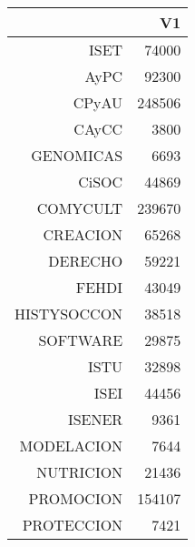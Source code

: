 \documentclass[12pt]{article}
\begin{document}
\begin{table}[ht]
\centering
\begin{tabular}{rr}
  \hline
 & V1 \\ 
  \hline
ISET & 74000 \\ 
  AyPC & 92300 \\ 
  CPyAU & 248506 \\ 
  CAyCC & 3800 \\ 
  GENOMICAS & 6693 \\ 
  CiSOC & 44869 \\ 
  COMYCULT & 239670 \\ 
  CREACION & 65268 \\ 
  DERECHO & 59221 \\ 
  FEHDI & 43049 \\ 
  HISTYSOCCON & 38518 \\ 
  SOFTWARE & 29875 \\ 
  ISTU & 32898 \\ 
  ISEI & 44456 \\ 
  ISENER & 9361 \\ 
  MODELACION & 7644 \\ 
  NUTRICION & 21436 \\ 
  PROMOCION & 154107 \\ 
  PROTECCION & 7421 \\ 
   \hline
\end{tabular}
\end{table}
\end{document}
